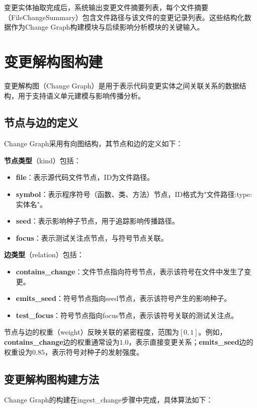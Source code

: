 变更实体抽取完成后，系统输出变更文件摘要列表，每个文件摘要（FileChangeSummary）包含文件路径与该文件的变更记录列表。这些结构化数据作为Change Graph构建模块与后续影响分析模块的关键输入。

\section{变更解构图构建}
变更解构图（Change Graph）是用于表示代码变更实体之间关联关系的数据结构，用于支持语义单元建模与影响传播分析。

\subsection{节点与边的定义}
Change Graph采用有向图结构，其节点和边的定义如下：

\textbf{节点类型}（kind）包括：
\begin{itemize}
    \item \textbf{file}：表示源代码文件节点，ID为文件路径。
    \item \textbf{symbol}：表示程序符号（函数、类、方法）节点，ID格式为"文件路径:type:实体名"。
    \item \textbf{seed}：表示影响种子节点，用于追踪影响传播路径。
    \item \textbf{focus}：表示测试关注点节点，与符号节点关联。
\end{itemize}

\textbf{边类型}（relation）包括：
\begin{itemize}
    \item \textbf{contains\_change}：文件节点指向符号节点，表示该符号在文件中发生了变更。
    \item \textbf{emits\_seed}：符号节点指向seed节点，表示该符号产生的影响种子。
    \item \textbf{test\_focus}：符号节点指向focus节点，表示该符号关联的测试关注点。
\end{itemize}

节点与边的权重（weight）反映关联的紧密程度，范围为$[0, 1]$。例如，\textbf{contains\_change}边的权重通常设为$1.0$，表示直接变更关系；\textbf{emits\_seed}边的权重设为$0.85$，表示符号对种子的发射强度。

\subsection{变更解构图构建方法}
Change Graph的构建在ingest\_change步骤中完成，具体算法如下：

